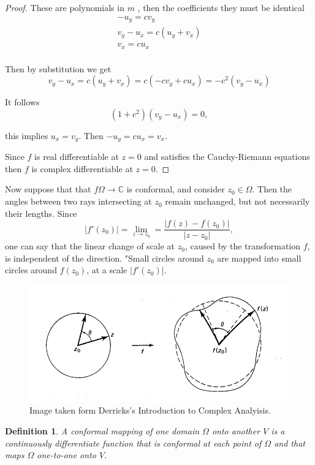 \documentclass{amsart}
\newtheorem{mydef}{Definition}
\begin{document}
\begin{proof}
These are polynomials in \(m\) , then the coefficients they must be identical
\begin{eqnarray}
-u_y = cv_y \\
v_y - u_x = c(u_y + v_x) \\
v_x = cu_x \\
\end{eqnarray}

Then by substitution we get
\begin{equation}
v_y - u_x = c(u_y + v_x) = c( - cv_y + cu_x) = -c^2 (v_y - u_x)
\end{equation}

It follows
\[ (1 + c^2) (v_y - u_x) = 0,\]

this implies \(u_x = v_y\). Then \(-u_y = c u_x = v_x\). 

Since \(f\) is real differentiable at \(z=0\) and satisfies the Cauchy-Riemann equations then \(f\) is complex differentiable at \(z=0\).
\end{proof}


Now suppose that that \(f\Omega\to\mathbb{C}\) is conformal, and consider \(z_0\in \Omega\). Then the angles between two rays intersecting at \(z_0\) remain unchanged, but not necessarily their lengths. Since
\[ |f'(z_0) | = \lim_{z\to z_0} = \frac{|f(z) - f(z_0)|}{|z-z_0|}, \] 
one can say that the linear change of scale at \(z_0\), caused by the transformation \(f\), is independent of the direction. "Small circles around \(z_0\) are mapped into small circles around \(f(z_0)\), at a scale \(|f'(z_0)|\).

\begin{figure}[htbp]
\centering
\includegraphics[width=.9\linewidth]{./conf_scale.png}
\caption{Image taken form Derricks's Introduction to Complex Analyisis.}
\end{figure}


\begin{mydef}
A conformal mapping of one domain \(\Omega\) onto another \(V\) is a continuously
differentiate function that is conformal at each point of \(\Omega\) and that maps \(\Omega\)
one-to-one onto \(V\).
\end{mydef}
\end{document}
